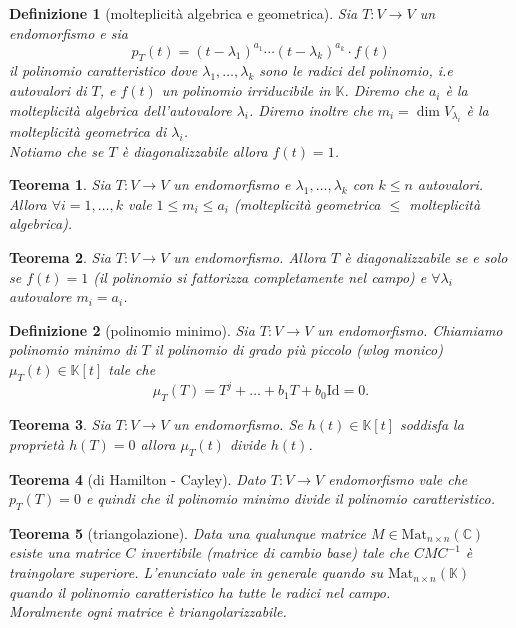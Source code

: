 \documentclass[9pt, a4paper]{article}
\newcommand{\C}{\mathbb{C}}
\newcommand{\K}{\mathbb{K}}
\newcommand{\Id}{\mathrm{Id}}
\theoremstyle{mythm}
\newtheorem{definition}{Definizione}[section]
\newtheorem{thm}{Teorema}[section]
\begin{document}
\begin{definition}[molteplicità algebrica e geometrica]
	Sia $ T \colon V \to V $ un endomorfismo e sia \[p_T(t) = (t - \lambda_1)^{a_1} \cdots (t - \lambda_k)^{a_k} \cdot f(t)\] il polinomio caratteristico dove $ \lambda_1, \ldots, \lambda_k $ sono le radici del polinomio, i.e autovalori di $ T $, e $ f(t) $ un polinomio irriducibile in $ \K $. Diremo che $ a_i $ è la molteplicità algebrica dell'autovalore $ \lambda_i $. Diremo inoltre che $ m_i = \dim V_{\lambda_i} $ è la molteplicità geometrica di $ \lambda_i $. \\
	Notiamo che se $ T $ è diagonalizzabile allora $ f(t) = 1 $. 
\end{definition}

\begin{thm}
	Sia $ T \colon V \to V $ un endomorfismo e $ \lambda_1, \ldots, \lambda_k $ con $ k \leq n $ autovalori. Allora $ \forall i = 1, \ldots, k $ vale $ 1 \leq m_i \leq a_i $ (molteplicità geometrica $ \leq $ molteplicità algebrica). 
\end{thm}

\begin{thm}
	Sia $ T \colon V \to V $ un endomorfismo. Allora $ T $ è diagonalizzabile se e solo se $ f(t) = 1 $ (il polinomio si fattorizza completamente nel campo) e $ \forall \lambda_i $ autovalore $ m_i = a_i $. 
\end{thm}

\begin{definition}[polinomio minimo]
	Sia $ T \colon V \to V $ un endomorfismo. Chiamiamo polinomio minimo di $ T $ il polinomio di grado più piccolo (\emph{wlog} monico) $ \mu_T(t) \in \K[t] $ tale che \[\mu_T(T) = T^j + \ldots + b_1 T + b_0 \Id = 0.\] 
\end{definition}

\begin{thm}
	Sia $ T \colon V \to V $ un endomorfismo. Se $ h(t) \in \K[t] $ soddisfa la proprietà $ h(T) = 0 $ allora $ \mu_T(t) $ divide $ h(t) $. 
\end{thm}

\begin{thm}[di Hamilton - Cayley]
	Dato $ T \colon V \to V $ endomorfismo vale che $ p_T(T) = 0 $ e quindi che il polinomio minimo divide il polinomio caratteristico. 
\end{thm}

\begin{thm}[triangolazione]
	Data una qualunque matrice $ M \in \mathrm{Mat}_{n \times n} (\C) $ esiste una matrice $ C $ invertibile (matrice di cambio base) tale che $ CMC^{-1} $ è traingolare superiore. L'enunciato vale in generale quando su $ \mathrm{Mat}_{n \times n} (\K) $ quando il polinomio caratteristico ha tutte le radici nel campo. \\ Moralmente ogni matrice è triangolarizzabile. 
\end{thm}
\end{document}
